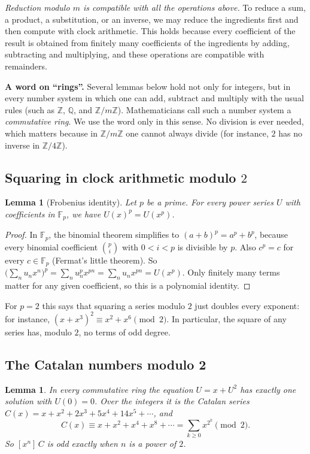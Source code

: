 \documentclass[11pt,a4paper]{article}
\newtheorem{lemma}[theorem]{Lemma}
\theoremstyle{definition}
\theoremstyle{remark}
\newcommand{\Z}{\mathbb{Z}}
\newcommand{\Q}{\mathbb{Q}}
\newcommand{\F}{\mathbb{F}}
\newcommand{\coeff}[2]{[x^{#1}]\,#2}
\newcommand{\para}[1]{\par\medskip\noindent\textbf{#1}\enspace}
\begin{document}
\emph{Reduction modulo $m$ is compatible with all the operations above.} To reduce a sum, a product, a substitution, or
an inverse, we may reduce the ingredients first and then compute with clock arithmetic. This holds because every
coefficient of the result is obtained from finitely many coefficients of the ingredients by adding, subtracting and
multiplying, and these operations are compatible with remainders.

\para{A word on ``rings''.} Several lemmas below hold not only for integers, but in every number system in
which one can add, subtract and multiply with the usual rules (such as $\Z$, $\Q$, and $\Z/m\Z$). Mathematicians call
such a number system a \emph{commutative ring}. We use the word only in this sense. No division is ever needed, which
matters because in $\Z/m\Z$ one cannot always divide (for instance, $2$ has no inverse in $\Z/4\Z$).

\subsection{Squaring in clock arithmetic modulo \texorpdfstring{$2$}{2}}
\begin{lemma}[Frobenius identity]\label{lem:frobenius}
Let $p$ be a prime. For every power series $U$ with coefficients in $\F_p$, we have $U(x)^p=U(x^p)$.
\end{lemma}

\begin{proof}
In $\F_p$, the binomial theorem simplifies to $(a+b)^p=a^p+b^p$, because every binomial coefficient
$\binom pi$ with $0<i<p$ is divisible by $p$. Also $c^p=c$ for every $c\in\F_p$ (Fermat's little theorem). So
$\bigl(\sum_nu_nx^n\bigr)^p=\sum_nu_n^px^{pn}=\sum_nu_nx^{pn}=U(x^p)$. Only finitely many terms matter for any given
coefficient, so this is a polynomial identity.
\end{proof}

For $p=2$ this says that squaring a series modulo $2$ just doubles every exponent: for instance,
$(x+x^3)^2\equiv x^2+x^6\pmod2$. In particular, the square of any series has, modulo $2$, no terms of odd degree.

\subsection{The Catalan numbers modulo 2}
\begin{lemma}\label{lem:catalan}
In every commutative ring the equation $U=x+U^2$ has exactly one solution with $U(0)=0$. Over the integers it is the
Catalan series $C(x)=x+x^2+2x^3+5x^4+14x^5+\cdots$, and
\[
C(x)\equiv x+x^2+x^4+x^8+\cdots=\sum_{k\ge0}x^{2^k}\pmod 2 .
\]
So $\coeff{n}{C}$ is odd exactly when $n$ is a power of $2$.
\end{lemma}
\end{document}
